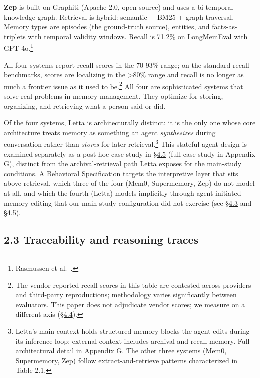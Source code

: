 \textbf{Zep} is built on Graphiti (Apache 2.0, open source) and uses a
bi-temporal knowledge graph. Retrieval is hybrid: semantic + BM25 +
graph traversal. Memory types are episodes (the ground-truth source),
entities, and facts-as-triplets with temporal validity windows.
Recall is 71.2\% on LongMemEval with GPT-4o.\footnote{Rasmussen
  et al.~\citep{rasmussen2025zep}.}

All four systems report recall scores in the 70-93\% range; on the
standard recall benchmarks, scores are localizing in the
\textgreater80\% range and recall is no longer as much a frontier issue
as it used to be.\footnote{The vendor-reported recall scores in this
  table are contested across providers and third-party reproductions;
  methodology varies significantly between evaluators. This paper does
  not adjudicate vendor scores; we measure on a different axis (\hyperref[memory-system-composition]{§4.4}).}
All four are sophisticated systems that solve real problems in memory
management. They optimize for storing, organizing, and retrieving what a
person said or did.

Of the four systems, Letta \citep{packer2023memgpt} is
architecturally distinct: it is the only one whose core architecture
treats memory as something an agent \emph{synthesizes} during
conversation rather than \emph{stores} for later retrieval.\footnote{Letta's
  main context holds structured memory blocks the agent edits during its
  inference loop; external context includes archival and recall memory.
  Full architectural detail in Appendix G. The other three systems
  (Mem0, Supermemory, Zep) follow extract-and-retrieve patterns
  characterized in Table 2.1.} This stateful-agent design is examined
separately as a post-hoc case study in \hyperref[exploratory-case-study-letta-stateful-agent-n3-post-hoc]{§4.5} (full case study in Appendix
G), distinct from the archival-retrieval path Letta exposes for the
main-study conditions. A Behavioral Specification targets the
interpretive layer that sits above retrieval, which three of the four
(Mem0, Supermemory, Zep) do not model at all, and which the fourth
(Letta) models implicitly through agent-initiated memory editing that
our main-study configuration did not exercise (see \hyperref[mechanism-correct-content-not-format]{§4.3} and \hyperref[exploratory-case-study-letta-stateful-agent-n3-post-hoc]{§4.5}).

\hypertarget{traceability-and-reasoning-traces}{%
\subsection{2.3 Traceability and reasoning
traces}\label{traceability-and-reasoning-traces}}

